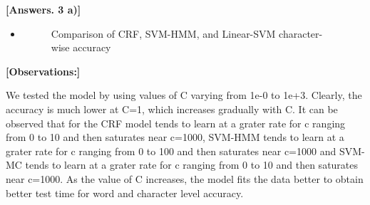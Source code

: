 \documentclass[11pt]{report}
\begin{document}
\begin{itemize}
	{\bf [Answers. 3 a)]} 
	\begin{itemize}
	    \item 
	    	\begin{figure}[H]
            	\centering
            	\caption{Comparison of CRF, SVM-HMM, and Linear-SVM character-wise accuracy}
            	\label{fig:compare_optimizer}
            \end{figure}
	\end{itemize}
	
    {\bf [Observations:]}
	
	We tested the model by using values of C varying from 1e-0 to 1e+3. Clearly, the accuracy is much lower at C=1, which increases gradually with C. It can be observed that for the CRF model tends to learn at a grater rate for c ranging from 0 to 10 and then saturates near c=1000, SVM-HMM tends to learn at a grater rate for c ranging from 0 to 100 and then saturates near c=1000 and SVM-MC tends to learn at a grater rate for c ranging from 0 to 10 and then saturates near c=1000. As the value of C increases, the model fits the data better to obtain better test time for word and character level accuracy. 
	

\end{itemize}
\end{document}
